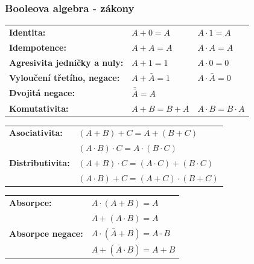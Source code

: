 	\begin{frame}
    \frametitle{Booleova algebra - zákony}
		\boldmath
		
		\begin{tabular}{ p{5cm} l l}
			\textbf{Identita:} & $A + 0 = A$ & $A\cdot 1 = A$ \\
			\textbf{Idempotence:} & $A + A = A$ & $A\cdot A = A$ \\
			\textbf{Agresivita jedničky a nuly:} & $A + 1 = 1$ & $A\cdot 0 = 0$ \\
			\textbf{Vyloučení třetího, negace:} & $A + \bar{A} = 1$ & $A\cdot \bar{A} = 0$ \\
			\textbf{Dvojitá negace:} & $\bar{\bar{A}} = A$ & \\
			\textbf{Komutativita:} & $A + B = B + A$ & $A\cdot B = B \cdot A$ \\
		\end{tabular}
		
		\vspace{3mm}
		\begin{tabular}{ p{5cm} l}
			\textbf{Asociativita:} & $(A + B) + C= A + (B + C)$  \\
														 & $(A \cdot B) \cdot C= A \cdot (B \cdot C)$  \\
			\textbf{Distributivita:} & $(A + B) \cdot C= (A\cdot C) + (B \cdot C)$  \\
														 & $(A \cdot B) + C= (A+C) \cdot (B + C)$  \\
		\end{tabular}
		
		\vspace{3mm}
		\begin{tabular}{ p{5cm} l}
			\textbf{Absorpce:} & $A \cdot (A + B) = A$  \\
												 & $A + (A \cdot B) = A$  \\
			\textbf{Absorpce negace:} & $A \cdot (\bar{A} + B) = A \cdot B$  \\
												 & $A + (\bar{A} \cdot B) = A + B$  \\
		\end{tabular}

	\end{frame}
	

